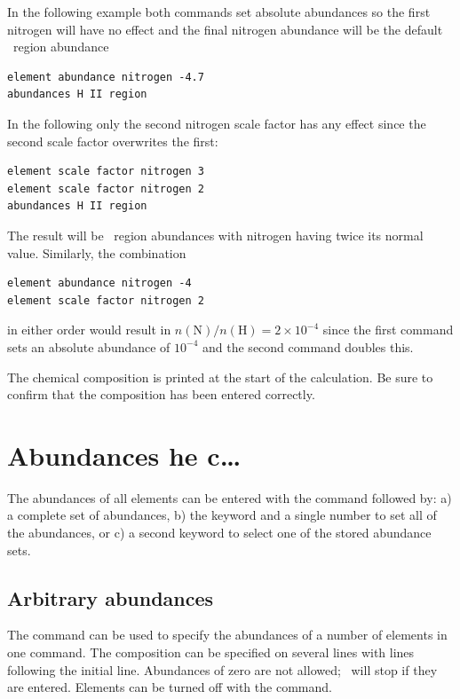 In the following example both commands set absolute abundances so the
first nitrogen  will have no effect and the final nitrogen abundance
will be the default \hii\ region abundance
\begin{verbatim}
element abundance nitrogen -4.7
abundances H II region
\end{verbatim}
In the following only the second nitrogen scale factor has any
effect since the second scale factor overwrites the first:
\begin{verbatim}
element scale factor nitrogen 3
element scale factor nitrogen 2
abundances H II region
\end{verbatim}
The result will be \hii\ region abundances with nitrogen having twice its
normal value.
Similarly, the combination
\begin{verbatim}
element abundance nitrogen -4
element scale factor nitrogen 2
\end{verbatim}
in either order would result in
$n(\mathrm{N})/n(\mathrm{H}) = 2\times10^{-4}$ since the first command
sets an absolute abundance of $10^{-4}$ and the second command
doubles this.

The chemical composition is printed at the start of the calculation.
Be sure to confirm that the composition has been entered correctly.

\section{Abundances he c\dots}
\label{sec:CommandAbundances}

The abundances of all elements can be entered with the command
followed by:
a) a complete set of abundances,
b) the keyword  and
a single number to set all of the abundances,
or c) a second keyword to select
one of the stored abundance sets.

\subsection{Arbitrary abundances}

The  command can be used to specify the abundances of
a number of elements in one command.
The composition can be
specified on several lines with  lines
following the initial  line.
Abundances of zero are not allowed; \Cloudy\ will stop if
they are entered.
Elements can be turned off with the  command.

